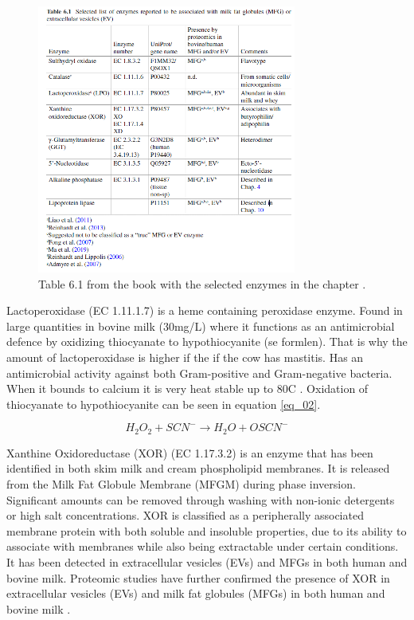 \begin{figure}
    \centering
    \includegraphics*[width=\linewidth]{Figures/table_01.png}
    \caption{Table 6.1 from the book with the selected enzymes in the chapter \cite*{RM_01}.}
    \label{fig_01}
\end{figure}

Lactoperoxidase (EC 1.11.1.7) is a heme containing peroxidase enzyme. Found in large quantities in bovine milk (30mg/L) where it functions as an antimicrobial defence by oxidizing thiocyanate to hypothiocyanite (se formlen). That is why the amount of lactoperoxidase is higher if the if the cow has mastitis. Has an antimicrobial activity against both Gram-positive and Gram-negative bacteria. When it bounds to calcium it is very heat stable up to 80\textdegree C \cite*{RM_01}. Oxidation of thiocyanate to hypothiocyanite can be seen in equation \ref*{eq_02}.

\begin{equation}
    H_2O_2 + SCN^- \rightarrow H_2O + OSCN^-
    \label{eq_02}
\end{equation}

Xanthine Oxidoreductase (XOR) (EC 1.17.3.2) is an enzyme that has been identified in both skim milk and cream phospholipid membranes. It is released from the Milk Fat Globule Membrane (MFGM) during phase inversion. Significant amounts can be removed through washing with non-ionic detergents or high salt concentrations. XOR is classified as a peripherally associated membrane protein with both soluble and insoluble properties, due to its ability to associate with membranes while also being extractable under certain conditions. It has been detected in extracellular vesicles (EVs) and MFGs in both human and bovine milk. Proteomic studies have further confirmed the presence of XOR in extracellular vesicles (EVs) and milk fat globules (MFGs) in both human and bovine milk \cite*{RM_01}.

